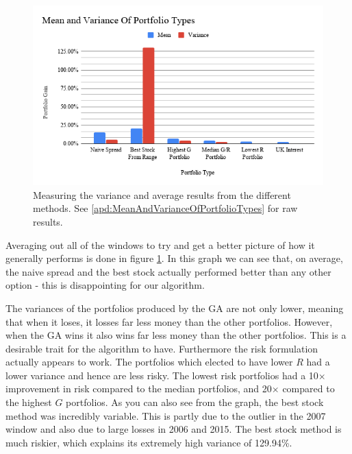 \documentclass[11pt]{article}
\begin{document}
    \begin{figure}[H] %
        \includegraphics[width=\textwidth]{MeanAndVarianceOfPortfolioTypes}
        \caption{Measuring the variance and average results from the different methods. See \ref{apd:MeanAndVarianceOfPortfolioTypes} for raw results.}\label{fig:MeanAndVarianceOfPortfolioTypes}
    \end{figure}

    Averaging out all of the windows to try and get a better picture of how it generally
    performs is done in figure \ref{fig:MeanAndVarianceOfPortfolioTypes}. In this graph
    we can see that, on average, the naive spread and the best stock actually performed
    better than any other option - this is disappointing for our algorithm.

    The variances of the portfolios produced by the GA are not only lower, meaning that
    when it loses, it losses far less money than the other portfolios. However, when the GA wins
    it also wins far less money than the other portfolios. This is a
    desirable trait for the algorithm to have. Furthermore the risk formulation
    actually appears to work. The portfolios which elected to have lower \(R\)
    had a lower variance and hence are less risky. The lowest risk portfolios
    had a 10\(\times\) improvement in risk compared to the median portfolios, and 20\(\times\)
    compared to the highest \(G\) portfolios. As you can also see from the graph, the best
    stock method was incredibly variable. This is partly due to the outlier in the 2007
    window and also due to large losses in 2006 and 2015. The best stock method
    is much riskier, which explains its extremely high variance of 129.94\%.
\end{document}
